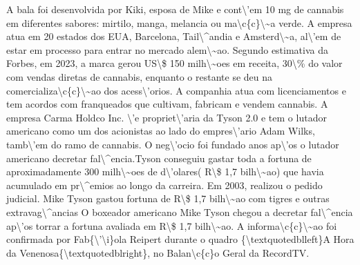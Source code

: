 \documentclass{article}%
\begin{document}
\newline%
A bala foi desenvolvida por Kiki, esposa de Mike e cont\textbackslash{}'em 10 mg de cannabis em diferentes sabores: mirtilo, manga, melancia ou ma\textbackslash{}c\{c\}\textbackslash{}\textasciitilde{}a verde.\newline%
\newline%
A empresa atua em 20 estados dos EUA, Barcelona, Tail\textbackslash{}\^{}andia e Amsterd\textbackslash{}\textasciitilde{}a, al\textbackslash{}'em de estar em processo para entrar no mercado alem\textbackslash{}\textasciitilde{}ao. Segundo estimativa da Forbes, em 2023, a marca gerou US\textbackslash{}\$ 150 milh\textbackslash{}\textasciitilde{}oes em receita, 30\textbackslash{}\% do valor com vendas diretas de cannabis, enquanto o restante se deu na comercializa\textbackslash{}c\{c\}\textbackslash{}\textasciitilde{}ao dos acess\textbackslash{}'orios.\newline%
\newline%
A companhia atua com licenciamentos e tem acordos com franqueados que cultivam, fabricam e vendem cannabis. A empresa Carma Holdco Inc. \textbackslash{}'e propriet\textbackslash{}'aria da Tyson 2.0 e tem o lutador americano como um dos acionistas ao lado do empres\textbackslash{}'ario Adam Wilks, tamb\textbackslash{}'em do ramo de cannabis.\newline%
\newline%
O neg\textbackslash{}'ocio foi fundado anos ap\textbackslash{}'os o lutador americano decretar fal\textbackslash{}\^{}encia.Tyson conseguiu gastar toda a fortuna de aproximadamente 300 milh\textbackslash{}\textasciitilde{}oes de d\textbackslash{}'olares( R\textbackslash{}\$ 1,7 bilh\textbackslash{}\textasciitilde{}ao) que havia acumulado em pr\textbackslash{}\^{}emios ao longo da carreira. Em 2003, realizou o pedido judicial. Mike Tyson gastou fortuna de R\textbackslash{}\$ 1,7 bilh\textbackslash{}\textasciitilde{}ao com tigres e outras extravag\textbackslash{}\^{}ancias\newline%
\newline%
O boxeador americano Mike Tyson chegou a decretar fal\textbackslash{}\^{}encia ap\textbackslash{}'os torrar a fortuna avaliada em R\textbackslash{}\$ 1,7 bilh\textbackslash{}\textasciitilde{}ao. A informa\textbackslash{}c\{c\}\textbackslash{}\textasciitilde{}ao foi confirmada por Fab\{\textbackslash{}'\textbackslash{}i\}ola Reipert durante o quadro \{\textbackslash{}textquotedblleft\}A Hora da Venenosa\{\textbackslash{}textquotedblright\}, no Balan\textbackslash{}c\{c\}o Geral da RecordTV.\newline%
\end{document}
